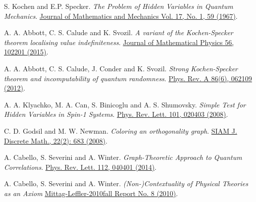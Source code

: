 \documentclass[twocolumn, a4paper, superscriptaddress,nofootinbib, accepted=2020-08-07, hyperref]{quantumarticle}
\def\textbf#1{{\bf #1}}
\begin{document}
\begin{thebibliography}{99}


S. Kochen and E.P. Specker.
\textit{The Problem of Hidden Variables in Quantum Mechanics}.
\href{https://www.jstor.org/stable/24902153}{Journal of Mathematics and Mechanics Vol. 17, No. 1, 59 (1967)}.


A. A. Abbott, C. S. Calude and K. Svozil.
\textit{A variant of the Kochen-Specker theorem localising value indefiniteness}.
\href{https://doi.org/10.1063/1.4931658}{Journal of Mathematical Physics 56, 102201 (2015)}. 

A. A. Abbott, C. S. Calude, J. Conder and K. Svozil.
\textit{Strong Kochen-Specker theorem and incomputability of quantum randomness}.
\href{https://doi.org/10.1103/PhysRevA.86.062109}{Phys. Rev. A 86(6), 062109 (2012)}.

A. A. Klyachko, M. A. Can, S. Binicoglu and A. S. Shumovsky. \textit{Simple Test for Hidden Variables in Spin-1 Systems}.
\href{https://doi.org/10.1103/PhysRevLett.101.020403}{Phys. Rev. Lett. 101, 020403 (2008)}.

C. D. Godsil and M. W. Newman. 
\textit{Coloring an orthogonality graph}. 
\href{https://doi.org/10.1137/050639715}{SIAM J. Discrete Math., 22(2): 683 (2008)}. 


A. Cabello, S. Severini and A. Winter.
\textit{Graph-Theoretic Approach to Quantum Correlations}.
\href{https://doi.org/10.1103/PhysRevLett.112.040401}{Phys. Rev. Lett. 112, 040401 (2014)}. 

A. Cabello, S. Severini and A. Winter.
\textit{(Non-)Contextuality of Physical Theories as an Axiom}
\href{http://www.mittag-leffler.se/sites/default/files/IML-1011f-08.pdf}{Mittag-Leffler-2010fall Report No. 8 (2010)}.




\end{thebibliography}
\end{document}

